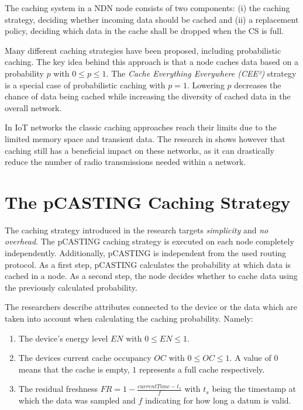 \documentclass[conference]{IEEEtran}
\begin{document}
The caching system in a NDN node consists of two components: (i) the caching strategy, deciding whether incoming data should be cached and (ii) a replacement policy, deciding which data in the cache shall be dropped when the CS is full.

Many different caching strategies have been proposed, including probabilistic caching\cite{Tarnoi2014}. The key idea behind this approach is that a node caches data based on a probability $p$ with $0 \leq p \leq 1$. The \textit{Cache Everything Everywhere (CEE²)} strategy is a special case of probabilistic caching with $p = 1$. Lowering $p$ decreases the chance of data being cached while increasing the diversity of cached data in the overall network.

In IoT networks the classic caching approaches reach their limits due to the limited memory space and transient data. The research in \cite{Baccelli2014} shows however that caching still has a beneficial impact on these networks, as it can drastically reduce the number of radio transmissions needed within a network.

\section{The pCASTING Caching Strategy}
\label{sec:pcasting}

The caching strategy introduced in the research targets \textit{simplicity} and \textit{no overhead}. The pCASTING caching strategy is executed on each node completely independently. Additionally, pCASTING is independent from the used routing protocol\cite{Amadeo2014}. As a first step, pCASTING calculates the probability at which data is cached in a node. As a second step, the node decides whether to cache data using the previously calculated probability.

The researchers describe attributes connected to the device or the data which are taken into account when calculating the caching probability. Namely:
\begin{enumerate}
	\item The device's energy level $EN$ with $0 \leq EN \leq 1$.
	\item The devices current cache occupancy $OC$ with $0 \leq OC \leq 1$. A value of $0$ means that the cache is empty, $1$ represents a full cache respectively.
	\item The residual freshness $FR = 1 - \frac{currentTime - t_s}{f}$ with $t_s$ being the timestamp at which the data was sampled and $f$ indicating for how long a datum is valid.
\end{enumerate}
\end{document}
